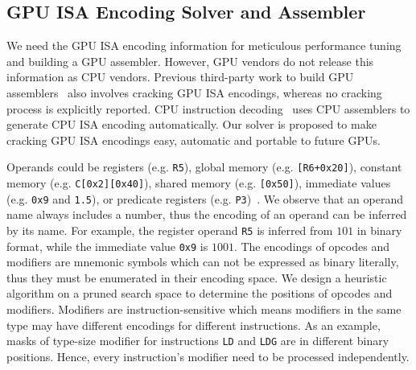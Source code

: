 \subsection{GPU ISA Encoding Solver and Assembler}
We need the GPU ISA encoding information for meticulous performance tuning and building a GPU assembler.
However, GPU vendors do not release this information as CPU vendors.
Previous third-party work to build GPU assemblers~\cite{decuda,asfermi,maxas} also
involves cracking GPU ISA encodings, whereas no cracking process is explicitly reported.
CPU instruction decoding~\cite{collberg1997reverse,engler2000derive} uses CPU assemblers to generate CPU ISA encoding automatically. 
Our solver is proposed to make cracking GPU ISA encodings easy, automatic and portable to future GPUs.


Operands could be registers (e.g. {\tt R5}), 
global memory (e.g. {\tt [R6+0x20]}), constant memory (e.g. {\tt C[0x2][0x40]}), shared memory (e.g. {\tt [0x50]}), immediate values (e.g. {\tt 0x9} and {\tt1.5}), or predicate registers (e.g. {\tt P3})~\cite{ptx2015isa}.
We observe that an operand name always includes a number, thus the encoding of an operand can be inferred by its name.
For example, the register operand {\tt R5} is inferred from $101$ in binary format, while the immediate value {\tt 0x9} is $1001$. 
The encodings of opcodes and modifiers are mnemonic symbols which can not be expressed as binary literally, thus they must be enumerated in their encoding space.
We design a heuristic algorithm on a pruned search space to determine the positions of opcodes and modifiers.
Modifiers are instruction-sensitive which means modifiers in the same type may have different encodings for different instructions. 
As an example, masks of type-size modifier for instructions {\tt LD} and {\tt LDG} are in different binary positions. 
Hence, every instruction's modifier need to be processed independently. 

